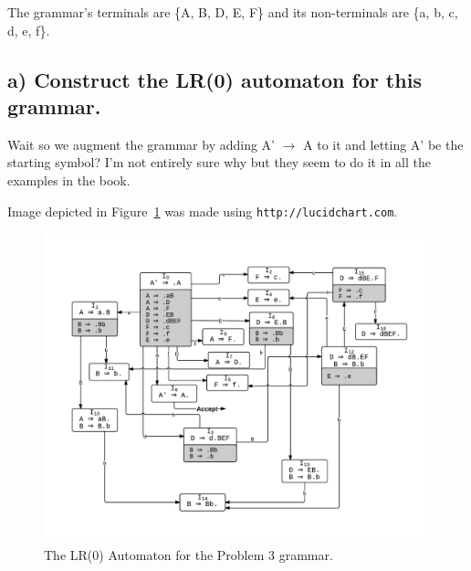The grammar's terminals are \{A, B, D, E, F\} and its non-terminals are \{a, b, c, d, e, f\}.


\subsection{a) Construct the LR(0) automaton for this grammar.}
Wait so we augment the grammar by adding A' $\rightarrow$ A to it and letting A' be the starting symbol?
I'm not entirely sure why but they seem to do it in all the examples in the book.




Image depicted in Figure~\ref{fig:1-3-a} was made using \texttt{http://lucidchart.com}.

\begin{figure}[H]
\begin{center}
\includegraphics[width=\textwidth]{gfx/1-3-a.pdf}
\caption{The LR(0) Automaton for the Problem 3 grammar.}
\label{fig:1-3-a}
\end{center}
\end{figure}

